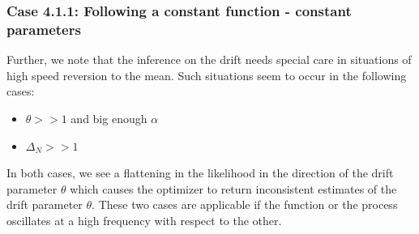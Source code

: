 \documentclass[aspectratio=169]{beamer}\usepackage[utf8]{inputenc}
\begin{document}
\begin{frame}\frametitle{ Case 4.1.1: Following a constant function - constant parameters }
Further, we note that the  inference on the drift needs special care in situations of high speed reversion to the mean. Such situations seem to occur in the following cases:
\begin{itemize}
\item  $ \theta > > 1$  and big enough $\alpha$
\item  $\Delta_N > > 1$ 

\end{itemize}
In both cases, we see a flattening in the likelihood in the direction of the drift parameter $\theta$ which  causes the optimizer to return inconsistent estimates of the drift parameter $\theta$. These two cases are applicable if the function or the process oscillates at a high frequency with respect to the other.

\end{frame}
\end{document}
